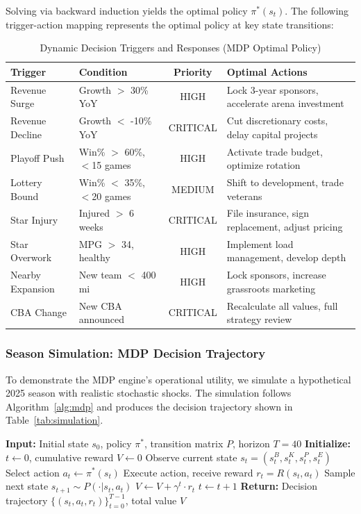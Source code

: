 \documentclass{mcmthesis}
\begin{document}
Solving via backward induction yields the optimal policy $\pi^*(s_t)$. The following trigger-action mapping represents the optimal policy at key state transitions:

\begin{table}[H]
\centering
\caption{Dynamic Decision Triggers and Responses (MDP Optimal Policy)}
\small
\begin{tabular}{p{3.0cm}p{3.0cm}cp{7.2cm}}
\toprule
\textbf{Trigger} & \textbf{Condition} & \textbf{Priority} & \textbf{Optimal Actions} \\
\midrule
Revenue Surge & Growth $>$ 30\% YoY & HIGH & Lock 3-year sponsors, accelerate arena investment \\
Revenue Decline & Growth $<$ -10\% YoY & CRITICAL & Cut discretionary costs, delay capital projects \\
\midrule
Playoff Push & Win\% $>$ 60\%, $<$15 games & HIGH & Activate trade budget, optimize rotation \\
Lottery Bound & Win\% $<$ 35\%, $<$20 games & MEDIUM & Shift to development, trade veterans \\
\midrule
Star Injury & Injured $>$ 6 weeks & CRITICAL & File insurance, sign replacement, adjust pricing \\
Star Overwork & MPG $>$ 34, healthy & HIGH & Implement load management, develop depth \\
\midrule
Nearby Expansion & New team $<$ 400 mi & HIGH & Lock sponsors, increase grassroots marketing \\
CBA Change & New CBA announced & CRITICAL & Recalculate all values, full strategy review \\
\bottomrule
\end{tabular}
\end{table}

\subsubsection{Season Simulation: MDP Decision Trajectory}

To demonstrate the MDP engine's operational utility, we simulate a hypothetical 2025 season with realistic stochastic shocks. The simulation follows Algorithm~\ref{alg:mdp} and produces the decision trajectory shown in Table~\ref{tab:simulation}.

\begin{algorithm}[H]
\caption{MDP Season Simulation}
\label{alg:mdp}
\begin{algorithmic}[1]
\STATE \textbf{Input:} Initial state $s_0$, policy $\pi^*$, transition matrix $P$, horizon $T=40$
\STATE \textbf{Initialize:} $t \leftarrow 0$, cumulative reward $V \leftarrow 0$
    \STATE Observe current state $s_t = (s_t^B, s_t^K, s_t^P, s_t^E)$
    \STATE Select action $a_t \leftarrow \pi^*(s_t)$
    \STATE Execute action, receive reward $r_t = R(s_t, a_t)$
    \STATE Sample next state $s_{t+1} \sim P(\cdot | s_t, a_t)$
    \STATE $V \leftarrow V + \gamma^t \cdot r_t$
    \STATE $t \leftarrow t + 1$
\ENDWHILE
\STATE \textbf{Return:} Decision trajectory $\{(s_t, a_t, r_t)\}_{t=0}^{T-1}$, total value $V$
\end{algorithmic}
\end{algorithm}
\end{document}
